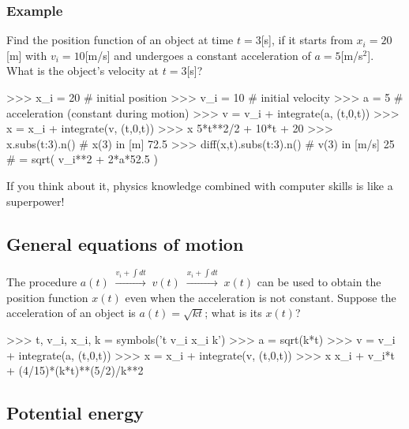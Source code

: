 \subsubsection{Example}

Find the position function of an object at time $t =3$[s], 
if it starts from $x_i=20$[m] with $v_i=10$[m/s] and undergoes 
a constant acceleration of $a=5$[m/s$^2$].
What is the object's velocity at $t=3$[s]?

\small
\begin{verbatimtab}
>>> x_i = 20   # initial position
>>> v_i = 10   # initial velocity
>>> a = 5      # acceleration (constant during motion)
>>> v = v_i + integrate(a, (t,0,t))
>>> x = x_i + integrate(v, (t,0,t))   
>>> x
5*t**2/2 + 10*t + 20
>>> x.subs({t:3}).n()           # x(3) in [m]
72.5           
>>> diff(x,t).subs({t:3}).n()   # v(3) in [m/s]
25                              # = sqrt( v_i**2 + 2*a*52.5 )
\end{verbatimtab}
\normalsize

\noindent
If you think about it,
physics knowledge combined with computer skills is like a superpower!


\subsection{General equations of motion}
\label{mechanics:general_eqns_of_motion}

The procedure 
$a(t) \; \overset{v_i+ \int\!dt }{\longrightarrow} \; v(t) \; \overset{x_i+ \int\!dt }{\longrightarrow} \; x(t)$
can be used to obtain the position function $x(t)$ even when the acceleration is not constant.
Suppose the acceleration of an object is $a(t)=\sqrt{k t}$; 
what is its $x(t)$?

\small
\begin{verbatimtab}
>>> t, v_i, x_i, k = symbols('t v_i x_i k')
>>> a = sqrt(k*t)
>>> v = v_i + integrate(a, (t,0,t))
>>> x = x_i + integrate(v, (t,0,t))
>>> x
x_i + v_i*t + (4/15)*(k*t)**(5/2)/k**2 
\end{verbatimtab}
\normalsize




\subsection{Potential energy}
\label{mechanics:potential_energy}


